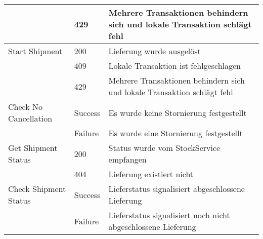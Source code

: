 \begin{center}
\begin{longtable}[h]{|p{3cm}|p{1.5cm}|p{11cm}|}
		& 429		& Mehrere Transaktionen behindern sich und lokale Transaktion schlägt fehl \\ \hline
		Start Shipment 		& 200		& Lieferung wurde ausgelöst \\
		& 409		& Lokale Transaktion ist fehlgeschlagen \\
		& 429 		& Mehrere Transaktionen behindern sich und lokale Transaktion schlägt fehl \\ \hline
		Check No Cancellation 	& Success	& Es wurde keine Stornierung festgestellt \\
		& Failure	& Es wurde eine Stornierung festgestellt \\ \hline
		Get Shipment Status	& 200 		& Status wurde vom StockService empfangen \\
		& 404		& Lieferung existiert nicht \\ \hline
		Check Shipment Status & Success	& Lieferstatus signalisiert abgeschlossene Lieferung \\
		& Failure 	& Lieferstatus signalisiert noch nicht abgeschlossene Lieferung \\ \hline
	\end{longtable}
\end{center}
\FloatBarrier

